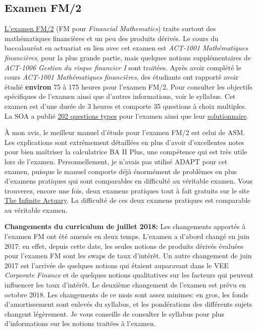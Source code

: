 \subsection*{Examen FM/2}
\label{subsec:examfm}
\href{https://www.soa.org/education/exam-req/edu-exam-fm-detail.aspx}{L'examen FM/2} (FM pour \textit{Financial Mathematics}) traite surtout des mathématiques financières et un peu des produits dérivés. Le cours du baccalauréat en actuariat en lien avec cet examen est \textit{ACT-1001 Mathématiques financières}, pour la plus grande partie, mais quelques notions supplémentaires de \textit{ACT-1006 Gestion du risque financier I} sont traitées. Après avoir complété le cours \textit{ACT-1001 Mathématiques financières}, des étudiants ont rapporté avoir étudié \textbf{environ} 75 à 175 heures pour l'examen FM/2. Pour consulter les objectifs spécifiques de l'examen ainsi que d'autres informations, voir le syllabus. Cet examen est d'une durée de 3 heures et comporte 35 questions à choix multiples. La SOA a publié \href{http://www.soa.org/Files/Edu/2017/exam-fm-sample-questions.pdf}{202 questions types} pour l'examen ainsi que leur \href{http://www.soa.org/Files/Edu/2017/exam-fm-sample-solutions.pdf}{solutionnaire}.\vspace{\baselineskip} 

À mon avis, le meilleur manuel d'étude pour l'examen FM/2 est celui de ASM. Les explications sont extrêmement détaillées en plus d'avoir d'excellentes notes pour bien maîtriser la calculatrice BA II Plus, une compétence qui est très utile lors de l'examen. Personnellement, je n'avais pas utilisé ADAPT pour cet examen, puisque le manuel comporte déjà énormément de problèmes en plus d'examens pratiques qui sont comparables en difficulté au véritable examen. Vous trouverez, encore une fois, deux examens pratiques tout à fait gratuits sur le site \href{http://www.theinfiniteactuary.com/exams/2}{The Infinite Actuary}. La difficulté de ces deux examens pratiques est comparable au véritable examen.\vspace{\baselineskip} 

\textbf{Changements du curriculum de juillet 2018:} Les changements apportés à l'examen FM ont été amenés en deux temps. L'examen a d'abord changé en juin 2017: en effet, depuis cette date, les seules notions de produits dérivés évaluées pour l'examen FM sont les swaps de taux d'intérêt. Un autre changement de juin 2017 est l'arrivée de quelques notions qui étaient auparavant dans le VEE \textit{Corporate Finance} et de quelques notions qualitatives sur les facteurs qui peuvent influencer les taux d'intérêt. Le deuxième changement de l'examen est prévu en octobre 2018. Les changements de ce mois sont assez minimes: en gros, les fonds d'amortissement sont enlevés du syllabus, et les pondérations des différents sujets changent légèrement. Je vous conseille de consulter le syllabus pour plus d'informations sur les notions traitées à l'examen.


